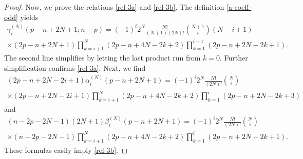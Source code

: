 \documentclass[a4paper,12pt,reqno]{amsart}
\numberwithin{theorem}{subsection}
\numberwithin{equation}{section}
\begin{document}
\begin{proof}
Now, we prove the relations \eqref{rel-3a} and \eqref{rel-3b}. The definition
\eqref{a-coeff-odd} yields
\begin{multline*}
   \gamma_i^{(N)}(p\!-\!n\!+\!2N\!+\!1;n\!-\!p)
   = (-1)^i 2^N \frac{N!}{(N\!+\!1)(2N)!} \binom{N+1}{i} (N\!-\!i\!+\!1) \\
   \times (2p\!-\!n\!+\!2N\!+\!1) \prod_{k=i+1}^N (2p\!-\!n\!+\!4N\!-\!2k\!+\!2)
   \prod_{k=1}^{i-1} (2p\!-\!n\!+\!2N\!-\!2k\!+\!1).
\end{multline*}
The second line simplifies by letting the last product run from $k=0$. Further
simplification confirms \eqref{rel-3a}. Next, we find
\begin{multline*}
   (2p\!-\!n\!+\!2N\!-\!2i\!+\!1) \alpha_i^{(N)}(p\!-\!n\!+\!2N\!+\!1) = (-1)^i
   2^N \frac{N!}{(2N)!} \binom{N}{i} \\ \times (2p\!-\!n\!+\!2N\!-\!2i\!+\!1)
   \prod_{k=i+1}^N (2p\!-\!n\!+\!4N\!-\!2k\!+\!2) \prod_{k=1}^i (2p\!-\!n\!+\!2N\!-\!2k\!+\!3)
\end{multline*}
and
\begin{multline*}
   (n\!-\!2p\!-\!2N\!-\!1) (2N\!+\!1) \beta_i^{(N)}(p\!-\!n\!+\!2N\!+\!1)
   = (-1)^{i} 2^N \frac{N!}{(2N)!} \binom{N}{i} \\
   \times (n\!-\!2p\!-\!2N\!-\!1) \prod_{k=i+1}^N (2p\!-\!n\!+\!4N\!-\!2k\!+\!2)
   \prod_{k=1}^i (2p\!-\!n\!+\!2N\!-\!2k\!+\!1).
\end{multline*}
These formulas easily imply \eqref{rel-3b}.


\end{proof}
\end{document}
